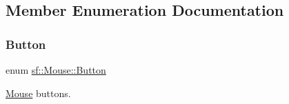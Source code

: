 \subsection{Member Enumeration Documentation}
\mbox{\label{classsf_1_1_mouse_a4fb128be433f9aafe66bc0c605daaa90}} 
\subsubsection{\texorpdfstring{Button}{Button}}
{\footnotesize\ttfamily enum \hyperlink{classsf_1_1_mouse_a4fb128be433f9aafe66bc0c605daaa90}{sf\+::\+Mouse\+::\+Button}}



\hyperlink{classsf_1_1_mouse}{Mouse} buttons. 


